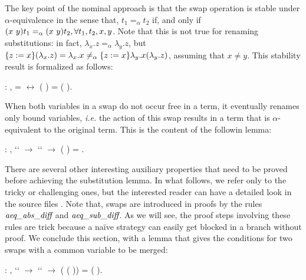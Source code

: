 The key point of the nominal approach is that the swap operation is stable under $\alpha$-equivalence in the sense that, $t_1 =_\alpha t_2$ if, and only if $\swap{x}{y}{t_1} =_\alpha \swap{x}{y}{t_2}, \forall t_1, t_2, x, y$. Note that this is not true for renaming substitutions: in fact, $\lambda_x.z =_\alpha \lambda_y.z$, but $\metasub{(\lambda_x.z)}{z}{x} = \lambda_x.x \neq_\alpha \metasub{\lambda_y.x (\lambda_y.z)}{z}{x}$, assuming that $x \neq y$. This stability result is formalized as follows: 
\begin{coqdoccode}
\coqdocemptyline
\coqdocnoindent
{} : \coqdockw{\ensuremath{\forall}}    ,  =  \ensuremath{\leftrightarrow} (   ) = (   ).\coqdoceol
\coqdocemptyline
\coqdocemptyline
\end{coqdoccode}
When both variables in a swap do not occur free in a term, it eventually renames only bound variables, {\it i.e.} the action of this swap results in a term that is $\alpha$-equivalent to the original term. This is the content of the followin lemma:
\begin{coqdoccode}
\coqdocemptyline
\coqdocnoindent
{} : \coqdockw{\ensuremath{\forall}}   ,  ``   \ensuremath{\rightarrow}  ``   \ensuremath{\rightarrow} (   ) =  .\coqdoceol
 \coqdocemptyline
\coqdocemptyline
\end{coqdoccode}
There are several other interesting auxiliary properties that need to be proved before achieving the substitution lemma. In what follows, we refer only to the tricky or challenging ones, but the interested reader can have a detailed look in the source files \cite{msubstlemma}. Note that, swaps are introduced in proofs by the rules $\mbox{\it aeq}\_\mbox{\it abs}\_\mbox{\it diff}$ and $\mbox{\it aeq}\_\mbox{\it sub}\_\mbox{\it diff}$. As we will see, the proof steps involving these rules are trick because a naïve strategy can easily get blocked in a branch without proof. We conclude this section, with a lemma that gives the conditions for two swaps with a common variable to be merged: 
\begin{coqdoccode}
\coqdocemptyline
\coqdocnoindent
{} : \coqdockw{\ensuremath{\forall}}    ,  ``   \ensuremath{\rightarrow}  ``   \ensuremath{\rightarrow} (   (   )) = (   ).\coqdoceol
\end{coqdoccode}
